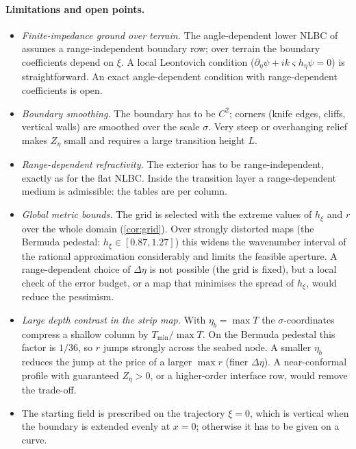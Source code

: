 \documentclass[11pt,a4paper]{article}
\theoremstyle{remark}
\newcommand{\etab}{\eta_{b}}
\newcommand{\pd}{\partial}
\begin{document}
\paragraph{Limitations and open points.}
\begin{itemize}
\item \emph{Finite-impedance ground over terrain.} The angle-dependent lower NLBC
of \cite{lytaev2022radarconf} assumes a range-independent boundary row; over
terrain the boundary coefficients depend on $\xi$. A local Leontovich condition
($\pd_\eta\psi+ik\varsigma h_\eta\psi=0$) is straightforward. An exact
angle-dependent condition with range-dependent coefficients is open.
\item \emph{Boundary smoothing.} The boundary has to be $C^2$; corners (knife
edges, cliffs, vertical walls) are smoothed over the scale $\sigma$. Very steep
or overhanging relief makes $Z_\eta$ small and requires a large transition
height $L$.
\item \emph{Range-dependent refractivity.} The exterior has to be
range-independent, exactly as for the flat NLBC. Inside the transition layer a
range-dependent medium is admissible: the tables are per column.
\item \emph{Global metric bounds.} The grid is selected with the extreme values
of $h_\xi$ and $r$ over the whole domain (\cref{cor:grid}). Over strongly
distorted maps (the Bermuda pedestal: $h_\xi\in[0.87,1.27]$) this widens the
wavenumber interval of the rational approximation considerably and limits the
feasible aperture. A range-dependent choice of $\Delta\eta$ is not possible (the
grid is fixed), but a local check of the error budget, or a map that minimises
the spread of $h_\xi$, would reduce the pessimism.
\item \emph{Large depth contrast in the strip map.} With $\etab=\max T$ the
$\sigma$-coordinates compress a shallow column by $T_{\min}/\max T$. On the Bermuda
pedestal this factor is $1/36$, so $r$ jumps strongly across the seabed node. A
smaller $\etab$ reduces the jump at the price of a larger $\max r$ (finer
$\Delta\eta$). A near-conformal profile with guaranteed $Z_\eta>0$, or a
higher-order interface row, would remove the trade-off.
\item The starting field is prescribed on the trajectory $\xi=0$, which is
vertical when the boundary is extended evenly at $x=0$; otherwise it has to be
given on a curve.
\end{itemize}



\end{document}
